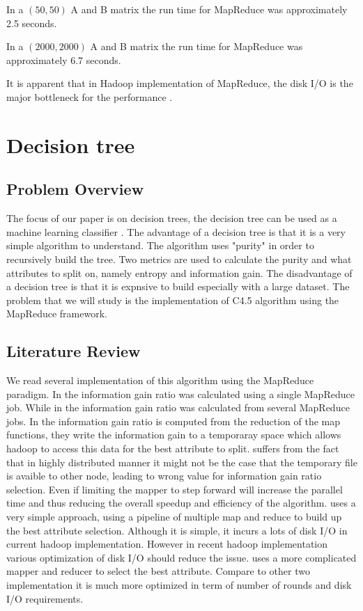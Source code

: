 \documentclass{article}
\begin{document}
In a $(50,50)$ A and B matrix the run time for MapReduce was approximately 2.5 seconds.

In a $(2000,2000)$ A and B matrix the run time for MapReduce was approximately 6.7 seconds.

It is apparent that in Hadoop implementation of MapReduce, the disk I/O is the major bottleneck for the performance \cite{c452017}.

\section{Decision tree}

\subsection{Problem Overview}
The focus of our paper is on decision trees, the decision tree can be used as a machine learning classifier \cite{quin1}.
The advantage of a decision tree is that it is a very simple algorithm to understand. The algorithm uses "purity" in order to recursively build the tree.
Two metrics are used to calculate the purity and what attributes to split on, namely entropy and information gain.
The disadvantage of a decision tree is that it is expnsive to build especially with a large dataset.
The problem that we will study is the implementation of C4.5 algorithm using the MapReduce framework.

\subsection{Literature Review}
We read several implementation of this algorithm using the MapReduce paradigm.
In \cite{c452017} the information gain ratio was calculated using a single MapReduce job.
While in \cite{c45cn} the information gain ratio was calculated from several MapReduce jobs.
In \cite{c45in} the information gain ratio is computed from the reduction of the map functions,
they write the information gain to a temporaray space which allows hadoop to access this data for the best attribute to split.
\cite{c45in} suffers from the fact that in highly distributed manner it might not be the case that the temporary file is avaible to other node,
 leading to wrong value for information gain ratio selection.
 Even if limiting the mapper to step forward will increase the parallel time and thus reducing the overall speedup and efficiency of the algorithm.
 \cite{c45cn} uses a very simple approach, using a pipeline of multiple map and reduce to build up the best attribute selection.
 Although it is simple, it incurs a lots of disk I/O in current hadoop implementation.
 However in recent hadoop implementation various optimization of disk I/O should reduce the issue.
 \cite{c452017} uses a more complicated mapper and reducer to select the best attribute.
  Compare to other two implementation it is much more optimized in term of number of rounds and disk I/O requirements.
\end{document}
